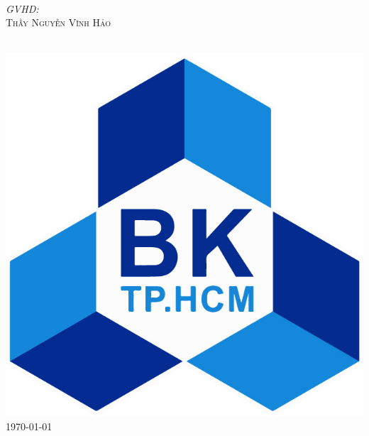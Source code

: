 \documentclass[a4paper, 12pt]{article}
\begin{document}
\begin{titlepage}
\begin{minipage}{0.4\textwidth}
\begin{flushleft}
\end{flushleft}
\end{minipage}
~
\begin{minipage}{0.4\textwidth}
\begin{flushright} \large
\emph{GVHD:} \\
\textsc{Thầy Nguyễn Vĩnh Hảo} %
\end{flushright}
\end{minipage}\\[1cm]


\includegraphics[scale=0.25]{images/LogoBK.jpg}\\[1cm] %

{\large \today}\\[0cm] %

\vfill %
\end{titlepage}
\end{document}
